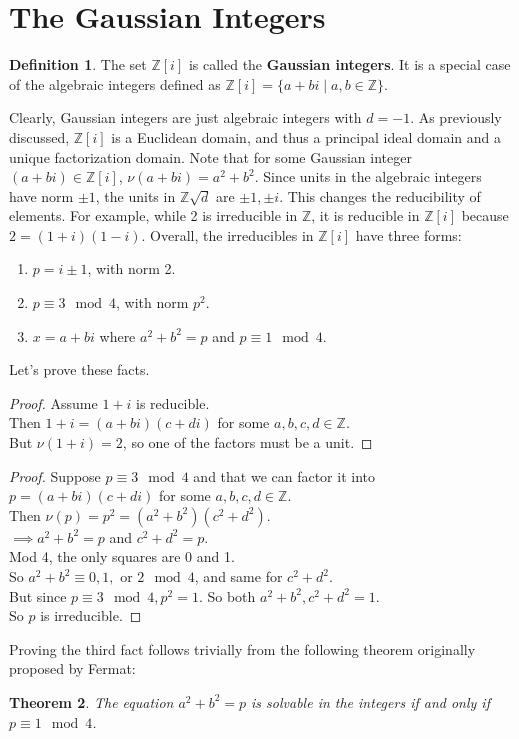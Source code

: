 \documentclass[11pt]{amsart}
\newtheorem{theorem}{Theorem}[section]
\theoremstyle{definition}
\newtheorem{definition}[theorem]{Definition}
\newcommand{\integers}{\mathbb{Z}}
\newcommand{\zd}{\mathbb{Z}\sqrt{d}} %
\newcommand{\zi}{\mathbb{Z}[i]} %
\begin{document}
\section{The Gaussian Integers}
\begin{definition}
	The set $\zi$ is called the \textbf{Gaussian integers}. It is a special case of the algebraic integers defined as
	$\zi = \{ a + bi \mid a, b \in \integers \}$.
\end{definition}
Clearly, Gaussian integers are just algebraic integers with $d = -1$. As previously discussed, $\zi$ is a Euclidean domain, and thus a principal
ideal domain and a unique factorization domain. Note that for some Gaussian integer $(a + bi) \in \zi$, $\nu(a + bi) = a^2 + b^2$. Since units in
the algebraic integers have norm $\pm 1$, the units in $\zd$ are $\pm 1, \pm i$. This changes the reducibility of elements. For example, while 2
is irreducible in $\integers$, it is reducible in $\zi$ because $2 = (1 + i)(1 - i)$. Overall, the irreducibles in $\zi$ have three forms:
\begin{enumerate}
	\item{
		$p = i \pm 1$, with norm 2.
	}
	\item{
		$p \equiv 3 \mod 4$, with norm $p^2$.
	}
	\item{
		$x = a + bi$ where $a^2 + b^2 = p$ and $p \equiv 1 \mod 4$.
	}
\end{enumerate}

Let's prove these facts.
\begin{proof}
	Assume $1 + i$ is reducible. \\
	Then $1 + i = (a + bi)(c + di)$ for some $a, b, c, d \in \integers$. \\
	But $\nu(1 + i) = 2$, so one of the factors must be a unit.
\end{proof}
\begin{proof}
	Suppose $p \equiv 3 \mod 4$ and that we can factor it into $p = (a + bi)(c + di)$ for some $a, b, c, d \in \integers$. \\
	Then $\nu(p) = p^2 = (a^2 + b^2)(c^2 + d^2)$. \\
	$\implies a^2 + b^2 = p$ and $c^2 + d^2 = p$. \\
	Mod 4, the only squares are 0 and 1. \\
	So $a^2 + b^2 \equiv 0, 1, \text{ or } 2 \mod 4$, and same for $c^2 + d^2$. \\
	But since $p \equiv 3 \mod 4, p^2 = 1$. So both $a^2 + b^2, c^2 + d^2 = 1$. \\
	So $p$ is irreducible.
\end{proof}
Proving the third fact follows trivially from the following theorem originally proposed by Fermat:
\begin{theorem}
	The equation $a^2 + b^2 = p$ is solvable in the integers if and only if $p \equiv 1 \mod 4$.
\end{theorem}
\end{document}
